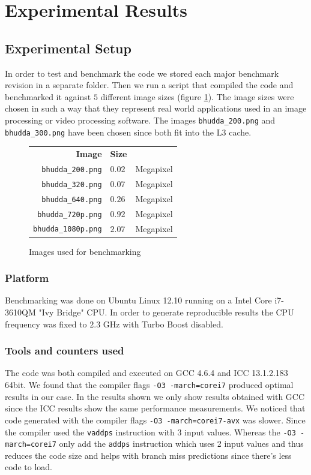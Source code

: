 \section{Experimental Results}\label{sec:exp}
\subsection{Experimental Setup}\label{sec:exp_setup8}
In order to test and benchmark the code we stored each major benchmark revision in a separate folder. Then we run a script that compiled the code and benchmarked it against $5$ different image sizes (figure \ref{tab:images}). The image sizes were chosen in such a way that they represent real world applications used in an image processing or video processing software. The images \texttt{bhudda\_200.png} and \texttt{bhudda\_300.png} have been chosen since both fit into the L3 cache. 
\begin{figure}
\centering
{\small
\begin{tabular}{rll}
\textbf{Image} & \textbf{Size}\\
\texttt{bhudda\_200.png} & $0.02$ & Megapixel\\
\texttt{bhudda\_320.png} & $0.07$ & Megapixel\\
\texttt{bhudda\_640.png} & $0.26$ & Megapixel\\
\texttt{bhudda\_720p.png} & $0.92$ & Megapixel\\
\texttt{bhudda\_1080p.png} & $2.07$ & Megapixel\\
\end{tabular}
}
\caption{Images used for benchmarking}
\label{tab:images}
\end{figure}

\subsubsection{Platform}
Benchmarking was done on Ubuntu Linux 12.10 running on a Intel Core i7-3610QM "Ivy Bridge" CPU. In order to generate reproducible results the CPU frequency was fixed to $2.3$ GHz with Turbo Boost disabled.
\subsubsection{Tools and counters used}
The code was both compiled and executed on GCC 4.6.4 and ICC 13.1.2.183 64bit. We found that the compiler flags \lstinline{-O3 -march=corei7} produced optimal results in our case. In the results shown we only show results obtained with GCC since the ICC results show the same performance measurements. We noticed that code generated with the compiler flags \lstinline{-O3 -march=corei7-avx} was slower. Since the compiler used the \lstinline{vaddps} instruction with 3 input values. Whereas the \lstinline{-O3 -march=corei7} only add the \lstinline{addps} instruction which uses 2 input values and thus reduces the code size and helps with branch miss predictions since there's less code to load. 

